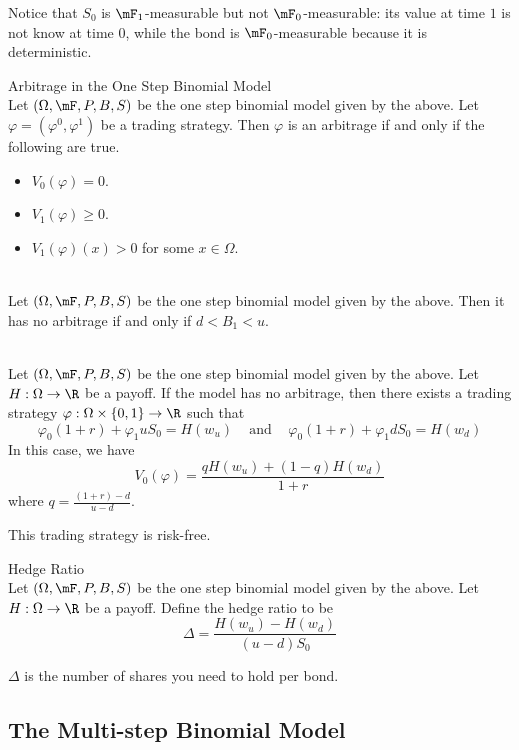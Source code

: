 \documentclass[a4paper]{article}
\begin{document}
Notice that $S_0$ is $\mF_1$-measurable but not $\mF_0$-measurable: its value at time $1$ is not know at time $0$, while the bond is $\mF_0$-measurable because it is deterministic. 

\begin{lmm}{Arbitrage in the One Step Binomial Model}{}\\
Let $(\Omega,\mF,P,B,S)$ be the one step binomial model given by the above. Let $\varphi=(\varphi^0,\varphi^1)$ be a trading strategy. Then $\varphi$ is an arbitrage if and only if the following are true. 
\begin{itemize}
\item $V_0(\varphi)=0$. 
\item $V_1(\varphi)\geq 0$. 
\item $V_1(\varphi)(x)>0$ for some $x\in\Omega$. 
\end{itemize}
\end{lmm}

\begin{lmm}{}{}\\
Let $(\Omega,\mF,P,B,S)$ be the one step binomial model given by the above. Then it has no arbitrage if and only if $d<B_1<u$. 
\end{lmm}

\begin{prp}{}{}\\
Let $(\Omega,\mF,P,B,S)$ be the one step binomial model given by the above. Let $H:\Omega\to\R$ be a payoff. If the model has no arbitrage, then there exists a trading strategy $\varphi:\Omega\times\{0,1\}\to\R$ such that $$\varphi_0(1+r)+\varphi_1uS_0=H(w_u)\;\;\;\text{ and }\;\;\;\varphi_0(1+r)+\varphi_1dS_0=H(w_d)$$ In this case, we have $$V_0(\varphi)=\frac{qH(w_u)+(1-q)H(w_d)}{1+r}$$ where $q=\frac{(1+r)-d}{u-d}$. 
\end{prp}

This trading strategy is risk-free. 

\begin{defn}{Hedge Ratio}{}\\
Let $(\Omega,\mF,P,B,S)$ be the one step binomial model given by the above. Let $H:\Omega\to\R$ be a payoff. Define the hedge ratio to be $$\Delta=\frac{H(w_u)-H(w_d)}{(u-d)S_0}$$
\end{defn}

$\Delta$ is the number of shares you need to hold per bond. 

\subsection{The Multi-step Binomial Model}
\end{document}
